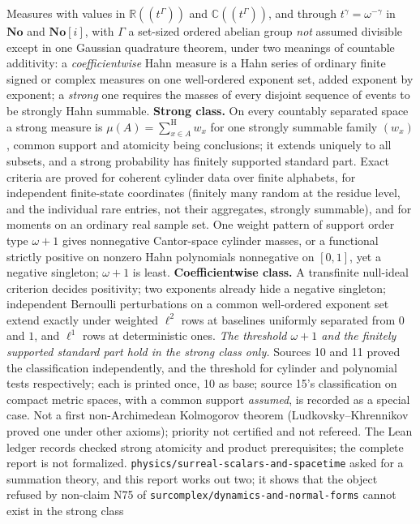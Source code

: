 \documentclass[11pt]{article}
\newcommand{\R}{\mathbb{R}}
\newcommand{\C}{\mathbb{C}}
\newcommand{\No}{\mathbf{No}}
\newcommand{\SC}{\mathbf{No}[i]}
\begin{document}
{Measures with values in $\R((t^\Gamma))$ and $\C((t^\Gamma))$, and through
$t^\gamma=\omega^{-\gamma}$ in $\No$ and $\SC$, with $\Gamma$ a set-sized ordered
abelian group \emph{not} assumed divisible except in one Gaussian quadrature
theorem, under two meanings of countable
additivity: a \emph{coefficientwise} Hahn measure is a Hahn series of ordinary
finite signed or complex measures on one well-ordered exponent set, added
exponent by exponent; a \emph{strong} one requires the masses of every
disjoint sequence of events to be strongly Hahn summable.
\textbf{Strong class.}  On every countably separated space a strong measure is
$\mu(A)=\sum^{\mathrm H}_{x\in A}w_x$ for one strongly summable family
$(w_x)$, common support and atomicity being conclusions; it extends uniquely
to all subsets, and a strong probability has finitely supported standard part.
Exact criteria are proved for coherent cylinder data over finite alphabets,
for independent finite-state coordinates (finitely many random at the residue
level, and the individual rare entries, not their aggregates, strongly
summable), and for moments on an ordinary real sample set.  One weight pattern
of support order type $\omega+1$ gives nonnegative Cantor-space cylinder
masses, or a functional strictly positive on nonzero Hahn polynomials
nonnegative on $[0,1]$, yet a negative singleton; $\omega+1$ is least.
\textbf{Coefficientwise class.}  A transfinite null-ideal criterion decides
positivity; two exponents already hide a negative singleton; independent
Bernoulli perturbations on a common well-ordered exponent set extend exactly
under weighted $\ell^2$ rows at baselines uniformly separated from $0$ and
$1$, and $\ell^1$ rows at deterministic ones.  \emph{The threshold $\omega+1$
and the finitely supported standard part hold in the strong class only.}  Sources 10 and
11 proved the classification independently, and the threshold for cylinder
and polynomial tests respectively; each is printed once, 10 as base; source 15's
classification on compact metric spaces, with a common support
\emph{assumed}, is recorded as a special case.  Not a first non-Archimedean
Kolmogorov theorem (Ludkovsky--Khrennikov proved one under other axioms);
priority not certified and not refereed.  The Lean ledger records checked
strong atomicity and product prerequisites; the complete report is not
formalized.
\nolinkurl{physics/surreal-scalars-and-spacetime} asked for a summation theory,
and this report works out two; it shows that the object refused by non-claim N75 of
\nolinkurl{surcomplex/dynamics-and-normal-forms} cannot exist in the strong class
}
\end{document}
